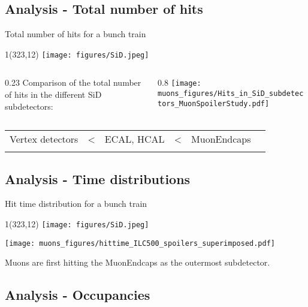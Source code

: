 \documentclass[xcolor={dvipsnames}]{beamer}
\newcommand{\sidlogo}{
  \setlength{\TPHorizModule}{1pt}
  \setlength{\TPVertModule}{1pt}
  \begin{textblock}{1}(323,12)
   \texttt{[image: figures/SiD.jpeg]}
  \end{textblock}
  }
\begin{document}
\subsection{Analysis - Total number of hits}
\begin{frame}{Total number of hits for a bunch train}
\sidlogo
\begin{columns}
 \begin{column}{0.23\textwidth}
 \small
  Comparison of the total number of hits in the different SiD subdetectors:
 \end{column}
 \begin{column}{0.8\textwidth}
\texttt{[image: muons\_figures/Hits\_in\_SiD\_subdetectors\_MuonSpoilerStudy.pdf]}
 \end{column}
\end{columns}
\begin{center}
\begin{tabular}{@{}p{}p{}p{}p{}p{}p{}@{}}
 \centering Vertex detectors & < & \centering ECAL, HCAL & < & \centering MuonEndcaps & \\
  \centering{\scriptsize Smallest effective detector area} & &  \centering{\scriptsize Particle showers} & &  \centering{\scriptsize Biggest effective detector area}&
\end{tabular}
\end{center}
\end{frame}

\subsection{Analysis - Time distributions}

\begin{frame}{Hit time distribution for a bunch train}
\sidlogo
 \begin{center}
\texttt{[image: muons\_figures/hittime\_ILC500\_spoilers\_superimposed.pdf]}
\end{center}
Muons are first hitting the MuonEndcaps as the outermost subdetector.
\end{frame}

\subsection{Analysis - Occupancies}
\end{document}

